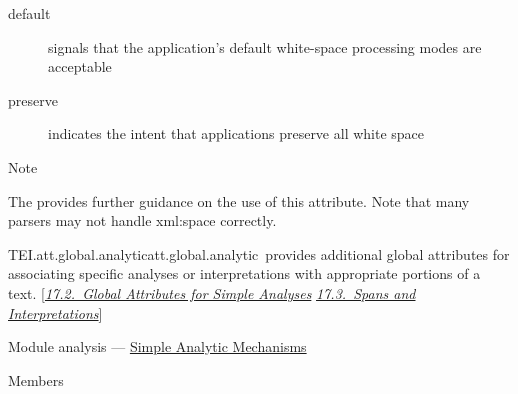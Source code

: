 \begin{reflist}
\begin{sansreflist}
\begin{reflist}
\begin{description}
\item[{default}]signals that the application's default white-space processing modes are acceptable
\item[{preserve}]indicates the intent that applications preserve all white space
\end{description} 
    \item[{Note}]
  \par
The  provides further guidance on the use of this attribute. Note that many parsers may not handle xml:space correctly.
\end{reflist}  
\end{sansreflist}  
\end{reflist}  
\begin{reflist}
\item[]\begin{specHead}{TEI.att.global.analytic}{att.global.analytic} provides additional global attributes for associating specific analyses or interpretations with appropriate portions of a text. [\textit{\hyperref[AIATTS]{17.2.\ Global Attributes for Simple Analyses}} \textit{\hyperref[AISP]{17.3.\ Spans and Interpretations}}]\end{specHead} 
    \item[{Module}]
  analysis — \hyperref[AI]{Simple Analytic Mechanisms}
    \item[{Members}]

\end{reflist}
